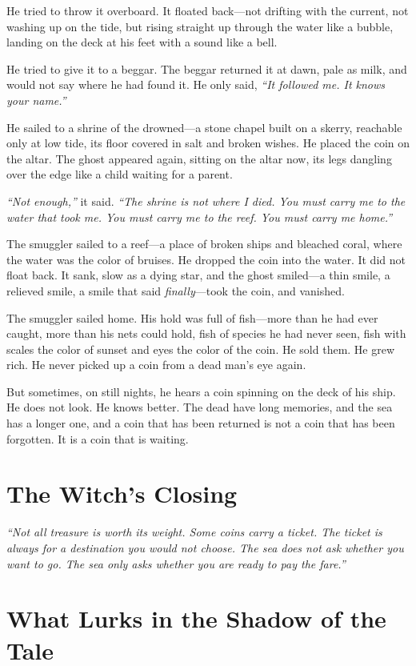 He tried to throw it overboard. It floated back---not drifting with the current, not washing up on the tide, but rising straight up through the water like a bubble, landing on the deck at his feet with a sound like a bell.

He tried to give it to a beggar. The beggar returned it at dawn, pale as milk, and would not say where he had found it. He only said, \textit{``It followed me. It knows your name.''}

He sailed to a shrine of the drowned---a stone chapel built on a skerry, reachable only at low tide, its floor covered in salt and broken wishes. He placed the coin on the altar. The ghost appeared again, sitting on the altar now, its legs dangling over the edge like a child waiting for a parent.

\textit{``Not enough,''} it said. \textit{``The shrine is not where I died. You must carry me to the water that took me. You must carry me to the reef. You must carry me home.''}

The smuggler sailed to a reef---a place of broken ships and bleached coral, where the water was the color of bruises. He dropped the coin into the water. It did not float back. It sank, slow as a dying star, and the ghost smiled---a thin smile, a relieved smile, a smile that said \textit{finally}---took the coin, and vanished.

The smuggler sailed home. His hold was full of fish---more than he had ever caught, more than his nets could hold, fish of species he had never seen, fish with scales the color of sunset and eyes the color of the coin. He sold them. He grew rich. He never picked up a coin from a dead man's eye again.

But sometimes, on still nights, he hears a coin spinning on the deck of his ship. He does not look. He knows better. The dead have long memories, and the sea has a longer one, and a coin that has been returned is not a coin that has been forgotten. It is a coin that is waiting.

\section*{The Witch's Closing}
\textit{``Not all treasure is worth its weight. Some coins carry a ticket. The ticket is always for a destination you would not choose. The sea does not ask whether you want to go. The sea only asks whether you are ready to pay the fare.''}

\section*{What Lurks in the Shadow of the Tale}

